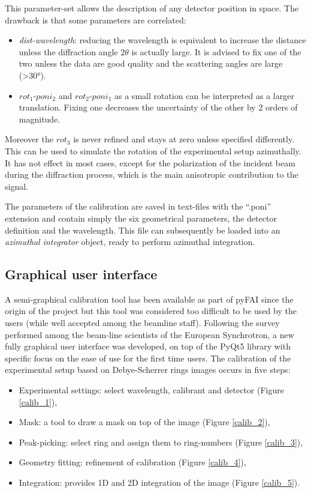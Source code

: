\documentclass[preprint, pdf]{iucr}              %
\begin{document}
This parameter-set allows the description of any detector position in space.
The drawback is that some parameters are correlated: 
\begin{itemize}
  \item \textit{dist-wavelength}: reducing the wavelength is equivalent to
  increase the distance unless the diffraction angle $2\theta$ is actually
  large. It is advised to fix one of the two unless the data are good
  quality and the scattering angles are large (>30°).
  \item $rot_1$-$poni_2$ and $rot_2$-$poni_1$ as a small rotation can be
  interpreted as a larger translation. Fixing one decreases the uncertainty of
  the other by 2 orders of magnitude.
\end{itemize}

Moreover the $rot_3$ is never refined and stays at zero unless specified
differently.  This can be used to simulate the rotation of the
experimental setup azimuthally. 
It has not effect in most cases, except for the
polarization of the incident beam during the diffraction process, which is the
main anisotropic contribution to the signal.

The parameters of the calibration are saved in text-files with the ``.poni''
extension and contain simply the six geometrical parameters, the detector
definition and the wavelength.
This file can subsequently be loaded into an \textit{azimuthal integrator}
object, ready to perform azimuthal integration.

\subsection{Graphical user interface}

A semi-graphical calibration tool has been available as part of pyFAI
\cite{fv5028} since the origin of the project but this tool was considered too
difficult to be used by the users (while well accepted among the beamline
staff).
Following the survey performed among the beam-line scientists of the European
Synchrotron, a new fully graphical user interface was developed, on top of 
the PyQt5 library \cite{pyqt} with specific focus on the ease of use for the
first time users.
The calibration of the experimental setup based on Debye-Scherrer rings images 
occurs in five steps:
\begin{itemize}
  \item Experimental settings: select wavelength, calibrant and detector (Figure
  \ref{calib_1}),
  \item Mask: a tool to draw a mask on top of the image (Figure
  \ref{calib_2}),
  \item Peak-picking: select ring and assign them to ring-numbers (Figure
  \ref{calib_3}),
  \item Geometry fitting: refinement of calibration (Figure
  \ref{calib_4}), 
  \item Integration: provides 1D and 2D integration of the image (Figure
  \ref{calib_5}). 
\end{itemize}
\end{document}
